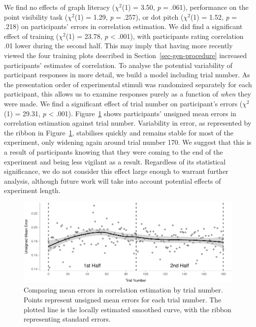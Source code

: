 \documentclass[sigconf]{acmart}
\begin{document}
We find no effects of graph literacy (\(\chi^2\)(1) = 3.50, \emph{p} =
.061), performance on the point visibility task (\(\chi^2\)(1) = 1.29,
\emph{p} = .257), or dot pitch (\(\chi^2\)(1) = 1.52, \emph{p} = .218)
on participants' errors in correlation estimation. We did find a
significant effect of training (\(\chi^2\)(1) = 23.78, \emph{p}
\textless{} .001), with participants rating correlation .01 lower during
the second half. This may imply that having more recently viewed the
four training plots described in Section~\ref{sec-gen-procedure}
increased participants' estimates of correlation. To analyse the
potential variability of participant responses in more detail, we build
a model including trial number. As the presentation order of
experimental stimuli was randomized separately for each participant,
this allows us to examine responses purely as a function of \emph{when}
they were made. We find a significant effect of trial number on
participant's errors (\(\chi^2\)(1) = 29.31, \emph{p} \textless{} .001).
Figure~\ref{fig-time-plot} shows participants' unsigned mean errors in
correlation estimation against trial number. Variability in error, as
represented by the ribbon in Figure~\ref{fig-time-plot}, stabilises
quickly and remains stable for most of the experiment, only widening
again around trial number 170. We suggest that this is a result of
participants knowing that they were coming to the end of the experiment
and being less vigilant as a result. Regardless of its statistical
significance, we do not consider this effect large enough to warrant
further analysis, although future work will take into account potential
effects of experiment length.

\begin{figure}

{\centering \includegraphics[width=1\textwidth,height=\textheight]{size_and_opacity_files/figure-pdf/fig-time-plot-1.pdf}

}

\caption{\label{fig-time-plot}Comparing mean errors in correlation
estimation by trial number. Points represent unsigned mean errors for
each trial number. The plotted line is the locally estimated smoothed
curve, with the ribbon representing standard errors.}

\end{figure}
\end{document}
